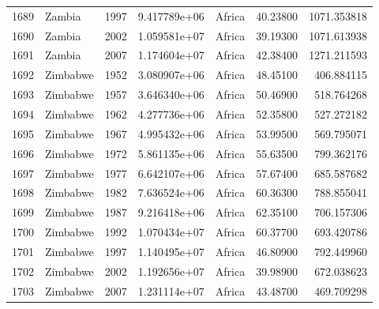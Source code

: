 \documentclass[
  letterpaper,
  DIV=11,
  numbers=noendperiod]{scrreprt}
\begin{document}
\begin{tabular}{llrrlrr}
1689 &                    Zambia &  1997 &  9.417789e+06 &    Africa &  40.23800 &    1071.353818 \\
1690 &                    Zambia &  2002 &  1.059581e+07 &    Africa &  39.19300 &    1071.613938 \\
1691 &                    Zambia &  2007 &  1.174604e+07 &    Africa &  42.38400 &    1271.211593 \\
1692 &                  Zimbabwe &  1952 &  3.080907e+06 &    Africa &  48.45100 &     406.884115 \\
1693 &                  Zimbabwe &  1957 &  3.646340e+06 &    Africa &  50.46900 &     518.764268 \\
1694 &                  Zimbabwe &  1962 &  4.277736e+06 &    Africa &  52.35800 &     527.272182 \\
1695 &                  Zimbabwe &  1967 &  4.995432e+06 &    Africa &  53.99500 &     569.795071 \\
1696 &                  Zimbabwe &  1972 &  5.861135e+06 &    Africa &  55.63500 &     799.362176 \\
1697 &                  Zimbabwe &  1977 &  6.642107e+06 &    Africa &  57.67400 &     685.587682 \\
1698 &                  Zimbabwe &  1982 &  7.636524e+06 &    Africa &  60.36300 &     788.855041 \\
1699 &                  Zimbabwe &  1987 &  9.216418e+06 &    Africa &  62.35100 &     706.157306 \\
1700 &                  Zimbabwe &  1992 &  1.070434e+07 &    Africa &  60.37700 &     693.420786 \\
1701 &                  Zimbabwe &  1997 &  1.140495e+07 &    Africa &  46.80900 &     792.449960 \\
1702 &                  Zimbabwe &  2002 &  1.192656e+07 &    Africa &  39.98900 &     672.038623 \\
1703 &                  Zimbabwe &  2007 &  1.231114e+07 &    Africa &  43.48700 &     469.709298 \\
\bottomrule
\end{tabular}
\end{document}
